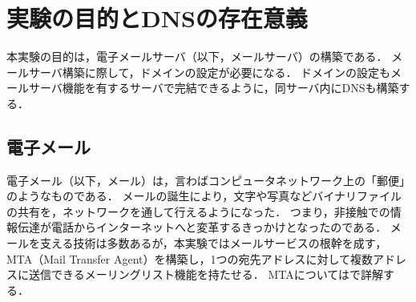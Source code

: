 \chapter{実験の目的とDNSの存在意義}
本実験の目的は，電子メールサーバ（以下，メールサーバ）の構築である．
メールサーバ構築に際して，ドメインの設定が必要になる．
ドメインの設定もメールサーバ機能を有するサーバで完結できるように，同サーバ内にDNSも構築する．
\section{電子メール}
電子メール（以下，メール）は，言わばコンピュータネットワーク上の「郵便」のようなものである．
メールの誕生により，文字や写真などバイナリファイルの共有を，ネットワークを通して行えるようになった．
つまり，非接触での情報伝達が電話からインターネットへと変革するきっかけとなったのである．
メールを支える技術は多数あるが，本実験ではメールサービスの根幹を成す，MTA（Mail Transfer Agent）を構築し，1つの宛先アドレスに対して複数アドレスに送信できるメーリングリスト機能を持たせる．
MTAについてはで詳解する．
